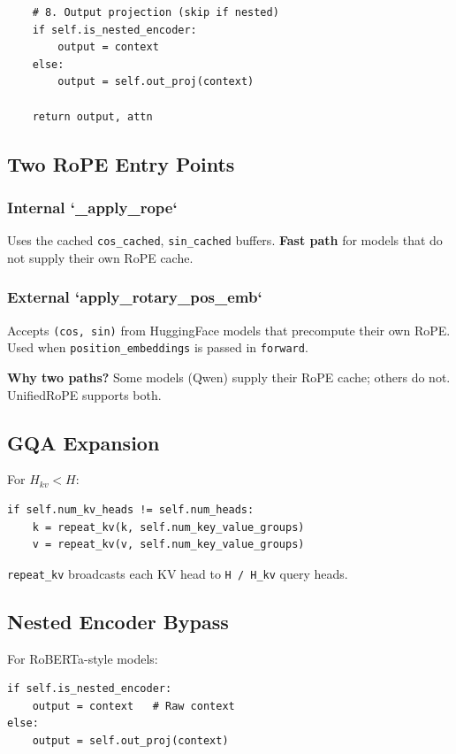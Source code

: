 {\begin{lstlisting}
    # 8. Output projection (skip if nested)
    if self.is_nested_encoder:
        output = context
    else:
        output = self.out_proj(context)
    
    return output, attn
\end{lstlisting}

\subsection{Two RoPE Entry Points}

\subsubsection{Internal `\_apply\_rope`}

Uses the cached \texttt{cos\_cached}, \texttt{sin\_cached} buffers. \textbf{Fast path} for models 
that do not supply their own RoPE cache.

\subsubsection{External `apply\_rotary\_pos\_emb`}

Accepts \texttt{(cos, sin)} from HuggingFace models that precompute their own 
RoPE. Used when \texttt{position\_embeddings} is passed in \texttt{forward}.

\textbf{Why two paths?} Some models (Qwen) supply their RoPE cache; others do 
not. UnifiedRoPE supports both.

\subsection{GQA Expansion}

For $H_{kv} < H$:

\begin{lstlisting}
if self.num_kv_heads != self.num_heads:
    k = repeat_kv(k, self.num_key_value_groups)
    v = repeat_kv(v, self.num_key_value_groups)
\end{lstlisting}

\texttt{repeat\_kv} broadcasts each KV head to \texttt{H / H\_{kv}} query heads.

\subsection{Nested Encoder Bypass}

For RoBERTa-style models:

\begin{lstlisting}
if self.is_nested_encoder:
    output = context   # Raw context
else:
    output = self.out_proj(context)
\end{lstlisting}

}
